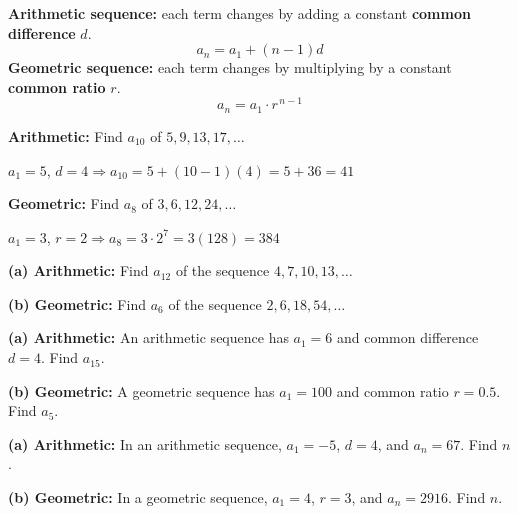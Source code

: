 \documentclass[11pt]{article}
\begin{document}
\begin{notebox}
\textbf{Arithmetic sequence:} each term changes by adding a constant \textbf{common difference} $d$.
$$a_n = a_1 + (n-1)d$$
\textbf{Geometric sequence:} each term changes by multiplying by a constant \textbf{common ratio} $r$.
$$a_n = a_1 \cdot r^{\,n-1}$$
\end{notebox}

\begin{examplebox}
\textbf{Arithmetic:} Find $a_{10}$ of $5, 9, 13, 17, \dots$

$a_1=5$, $d=4 \Rightarrow a_{10} = 5+(10-1)(4) = 5+36 = 41$

\vspace{2mm}
\textbf{Geometric:} Find $a_8$ of $3, 6, 12, 24, \dots$

$a_1=3$, $r=2 \Rightarrow a_8 = 3\cdot 2^{7} = 3(128) = 384$
\end{examplebox}

\begin{easybox}
\textbf{(a) Arithmetic:} Find $a_{12}$ of the sequence $4, 7, 10, 13, \dots$

\vspace{5mm}
\textbf{(b) Geometric:} Find $a_6$ of the sequence $2, 6, 18, 54, \dots$

\vspace{5mm}
\end{easybox}

\begin{medbox}
\textbf{(a) Arithmetic:} An arithmetic sequence has $a_1 = 6$ and common difference $d = 4$. Find $a_{15}$.

\vspace{5mm}
\textbf{(b) Geometric:} A geometric sequence has $a_1 = 100$ and common ratio $r = 0.5$. Find $a_5$.

\vspace{5mm}
\end{medbox}

\begin{hardbox}
\textbf{(a) Arithmetic:} In an arithmetic sequence, $a_1=-5$, $d=4$, and $a_n = 67$. Find $n$.

\vspace{5mm}
\textbf{(b) Geometric:} In a geometric sequence, $a_1=4$, $r=3$, and $a_n = 2916$. Find $n$.

\vspace{5mm}
\end{hardbox}

\newpage
\end{document}
